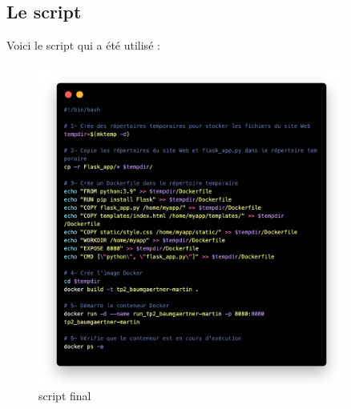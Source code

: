 \documentclass[12pt, a4paper]{article}
\begin{document}
\subsection{Le script}
Voici le script qui a été utilisé : 
\begin{figure}[h]
    \centering
    \includegraphics[width=0.9\textwidth]{img/script-f.png}
    \caption{script final}
    \label{fig:script-final}
\end{figure}
\end{document}
